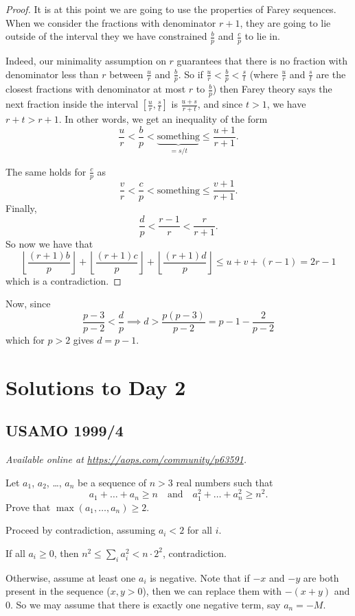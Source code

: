 \documentclass[11pt]{scrartcl}
\begin{document}
\begin{proof}
  It is at this point we are going to use the properties of Farey sequences.
  When we consider the fractions with denominator $r+1$,
  they are going to lie outside of the interval
  they we have constrained $\frac bp$ and $\frac cp$ to lie in.

  Indeed, our minimality assumption on $r$ guarantees that there is no
  fraction with denominator less than $r$ between $\frac ur$ and $\frac bp$.
  So if $\frac ur < \frac bp < \frac st$
  (where $\frac ur$ and $\frac st$ are the closest fractions
  with denominator at most $r$ to $\frac bp$)
  then Farey theory says the next fraction
  inside the interval $[\frac ur, \frac st]$
  is $\frac{u+s}{r+t}$, and since $t > 1$, we have $r+t > r+1$.
  In other words, we get an inequality of the form
  \[ \frac ur < \frac bp < \underbrace{\text{something}}_{=s/t} \le \frac{u+1}{r+1}. \]

  The same holds for $\frac cp$ as
  \[ \frac vr < \frac cp < \text{something} \le \frac{v+1}{r+1}. \]
  Finally,
  \[ \frac dp < \frac{r-1}{r} < \frac{r}{r+1}. \]
  So now we have that
  \[ \left\lfloor \frac{(r+1)b}{p} \right\rfloor
    + \left\lfloor \frac{(r+1)c}{p} \right\rfloor
    + \left\lfloor \frac{(r+1)d}{p} \right\rfloor
    \le u + v + (r-1) = 2r-1 \]
  which is a contradiction.
\end{proof}
Now, since
\[ \frac{p-3}{p-2} < \frac dp
  \implies d > \frac{p(p-3)}{p-2} = p - 1 - \frac{2}{p-2} \]
which for $p > 2$ gives $d = p-1$.
\pagebreak

\section{Solutions to Day 2}
\subsection{USAMO 1999/4}
\textsl{Available online at \url{https://aops.com/community/p63591}.}
\begin{mdframed}[style=mdpurplebox,frametitle={Problem statement}]
Let $a_1$, $a_2$, \dots, $a_n$ be a sequence of $n > 3$ real numbers
such that
\[ a_1 + \dots + a_n \ge n \quad\text{and}\quad
  a_1^2 + \dots + a_n^2 \ge n^2. \]
Prove that $\max(a_1, \dots, a_n) \ge 2$.
\end{mdframed}
Proceed by contradiction, assuming $a_i < 2$ for all $i$.

If all $a_i \ge 0$, then $ n^2 \le \sum_i a_i^2 < n \cdot 2^2$,
contradiction.

Otherwise, assume at least one $a_i$ is negative.
Note that if $-x$ and $-y$ are both present in the sequence ($x,y>0$),
then we can replace them with $-(x+y)$ and $0$.
So we may assume that there is exactly one negative term, say $a_n = -M$.
\end{document}
